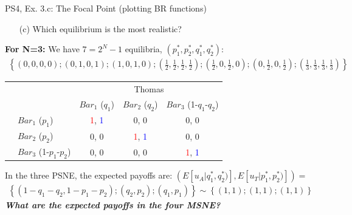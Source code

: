 \begin{frame}{PS4, Ex. 3.c: The Focal Point (plotting BR functions)}
    \begin{itemize}
      \item[(c)] Which equilibrium is the most realistic?
    \end{itemize}
    \textbf{For N=3:} We have $7=2^N-1$ equilibria, $(p_1^{*},p_2^{*},q_1^{*},q_2^{*})$:
    \begin{align*}
      \left\{(0,0,0,0);(0,1,0,1);(1,0,1,0)
      ;\left(\frac{1}{2},\frac{1}{2},\frac{1}{2},\frac{1}{2}\right)
      ;\left(\frac{1}{2},0,\frac{1}{2},0\right)
      ;\left(0,\frac{1}{2},0,\frac{1}{2}\right)
      ;\left(\frac{1}{3},\frac{1}{3},\frac{1}{3},\frac{1}{3}\right)
      \right\}
    \end{align*}
    \vspace{-18pt}
    \begin{table}
      \begin{tabular}{cl|c|c|c|}
        & \multicolumn{1}{c}{} & \multicolumn{3}{c}{\color{blue}Thomas}\\
        & \multicolumn{1}{c}{} & \multicolumn{1}{c}{$Bar_1$ ($q_1$)} & \multicolumn{1}{c}{$Bar_2$ ($q_2$)} & \multicolumn{1}{c}{$Bar_3$ (1-$q_1$-$q_2$)} \\\cline{3-5}
        \parbox[t]{1mm}{}
        & $Bar_1$ ($p_1$) & \textcolor{red}{1}, \textcolor{blue}{1} & 0, 0 & 0, 0 \\
        & $Bar_2$ ($p_2$) & 0, 0 & \textcolor{red}{1}, \textcolor{blue}{1} & 0, 0 \\
        & $Bar_3$ (1-$p_1$-$p_2$) & 0, 0 & 0, 0 & \textcolor{red}{1}, \textcolor{blue}{1} \\
      \end{tabular}
    \end{table}
    In the three PSNE, the expected payoffs are: $\left(E[u_A|q_1^{*},q_2^{*})],E[u_T|p_1^{*},p_2^{*})]\right)=$
    \begin{align*}
      \left\{(1-q_1-q_2,1-p_1-p_2);(q_2,p_2);(q_1,p_1)\right\}\sim
      \left\{(1,1);(1,1);(1,1)\right\}
    \end{align*}
    \textbf{\textit{What are the expected payoffs in the four MSNE?}}
  \vfill\null
\end{frame}
